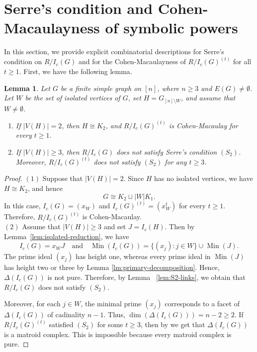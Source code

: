 \documentclass[12pt]{amsart}
\newtheorem{lemma}[proposition]{Lemma}
\begin{document}
\section{Serre's condition and Cohen-Macaulayness of symbolic powers}\label{sec:depth-properties}
In this section, we provide explicit combinatorial descriptions for Serre's condition on \(R/I_c(G)\) and for the Cohen-Macaulayness of \(R/I_c(G)^{(t)}\) for all \(t\geq 1\). First, we have the following lemma.
\begin{lemma}\label{lem:isolated-reduction1}
Let $G$ be a finite simple graph on $[n]$, where $n\geq3$ and $E(G)\neq\emptyset$. Let $W$ be the set of isolated vertices of $G$, set $H=G_{[n]\setminus W} $, and assume that $W\neq\emptyset$.
\begin{enumerate}
\item If $|V(H)|=2$, then $H\cong K_2$, and $R/I_c(G)^{(t)}$ is Cohen-Macaulay for every $t\geq1$.
\item If $|V(H)|\geq3$, then $R/I_c(G)$ does not satisfy Serre's condition $(S_2)$. Moreover, $R/I_c(G)^{(t)}$ does not satisfy $(S_2)$ for any $t\geq3$.
\end{enumerate}
\end{lemma}

\begin{proof}
$(1)$ Suppose that $|V(H)|=2$. Since $H$ has no isolated vertices, we have $H\cong K_2$, and hence
\[
G\cong K_2\sqcup |W|K_1.
\]
In this case, $I_c(G)=(x_W)$ and $I_c(G)^{(t)}=(x_W^t)$ for every $t\geq1$. Therefore, $R/I_c(G)^{(t)}$ is Cohen-Macaulay.\\
\noindent
$(2)$ Assume that $|V(H)|\geq3$ and set $J=I_c(H)$. Then by Lemma~\ref{lem:isolated-reduction}, we have
\[
I_c(G)=x_WJ
\quad\text{and}\quad
\operatorname{Min}(I_c(G))
=
\{(x_j):j\in W\}\cup\operatorname{Min}(J).
\]
The prime ideal $(x_j)$ has height one, whereas every prime ideal in $\operatorname{Min}(J)$ has height two or three by Lemma \ref{lm:primary-decomposition}. Hence, $\Delta(I_c(G))$ is not pure. Therefore, by Lemma~ \ref{lem:S2-links}, we obtain that $R/I_c(G)$ does not satisfy $(S_2)$.

Moreover, for each $j \in W$, the minimal prime $(x_j)$ corresponds to a facet of $\Delta(I_c(G))$ of cadinality $n - 1$. Thus, $\dim(\Delta(I_c(G))) = n - 2 \geq 2$. If $R/I_c(G)^{(t)}$ satisfied $(S_2)$ for some $t\geq3$, then by \cite[Theorem~3.6]{Trung-Terai} we get that $\Delta(I_c(G))$ is a matroid complex. This is impossible because every matroid complex is pure.
\end{proof}
\end{document}
